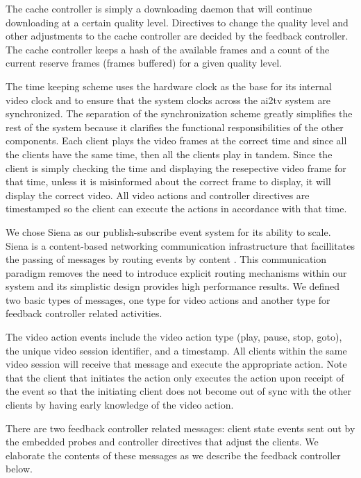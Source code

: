 \documentclass{sig-alternate}
\begin{document}
The cache controller is simply a downloading daemon that will continue
downloading at a certain quality level.  Directives to change the
quality level and other adjustments to the cache controller are
decided by the feedback controller.  The cache controller keeps a hash
of the available frames and a count of the current reserve frames
(frames buffered) for a given quality level.

The time keeping scheme uses the hardware clock as the base for its
internal video clock and to ensure that the system clocks across the
ai2tv system are synchronized.  The separation of the synchronization
scheme greatly simplifies the rest of the system because it clarifies
the functional responsibilities of the other components.  Each client
plays the video frames at the correct time and since all the clients
have the same time, then all the clients play in tandem.  Since the
client is simply checking the time and displaying the resepective
video frame for that time, unless it is misinformed about the correct
frame to display, it will display the correct video.  All video
actions and controller directives are timestamped so the client can
execute the actions in accordance with that time.

We chose Siena as our publish-subscribe event system for its ability
to scale.  Siena is a content-based networking communication
infrastructure that facillitates the passing of messages by routing
events by content \cite{SIENA}.  This communication paradigm removes
the need to introduce explicit routing mechanisms within our system
and its simplistic design provides high performance results.  We
defined two basic types of messages, one type for video actions and
another type for feedback controller related activities.  

The video action events include the video action type (play, pause,
stop, goto), the unique video session identifier, and a timestamp.
All clients within the same video session will receive that message
and execute the appropriate action.  Note that the client that
initiates the action only executes the action upon receipt of the
event so that the initiating client does not become out of sync with
the other clients by having early knowledge of the video action.

There are two feedback controller related messages: client state
events sent out by the embedded probes and controller directives that
adjust the clients.  We elaborate the contents of these messages as we
describe the feedback controller below.
\end{document}
